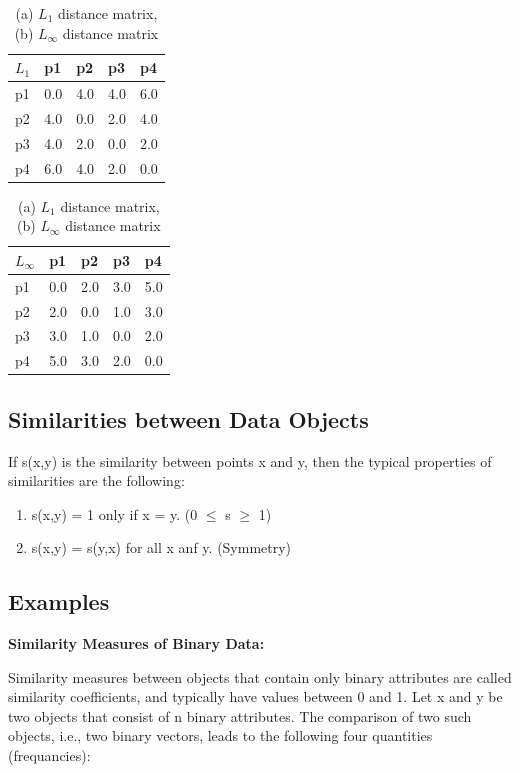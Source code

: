 	\begin{table}[H]
		\centering
		\begin{tabular}{| l | l | l | l | l |}
			\hline
			$L_{1}$ & p1 & p2 & p3 & p4 \\ \hline
			p1 & 0.0 & 4.0 & 4.0 & 6.0 \\ \hline
			p2 & 4.0 & 0.0 & 2.0 & 4.0 \\ \hline
			p3 & 4.0 & 2.0 & 0.0 & 2.0 \\ \hline
			p4 & 6.0 & 4.0 & 2.0 & 0.0 \\ \hline
		\end{tabular}
		\begin{tabular}{| l | l | l | l | l |}
			\hline
			$L_\infty$ & p1 & p2 & p3 & p4 \\ \hline 
			p1 & 0.0 & 2.0 & 3.0 & 5.0 \\ \hline
			p2 & 2.0 & 0.0 & 1.0 & 3.0 \\ \hline
			p3 & 3.0 & 1.0 & 0.0 & 2.0 \\ \hline
			p4 & 5.0 & 3.0 & 2.0 & 0.0 \\ \hline
		\end{tabular}
		\caption{(a) $L_{1}$ distance matrix, (b) $L_{\infty}$ distance matrix}
	\end{table}

\subsection*{Similarities between Data Objects}
	If s(x,y) is the similarity between points x and y, then the typical properties
	of similarities are the following:
		\begin{enumerate}
			\item s(x,y) = 1 only if x = y. (0 $\leq$ s $\geq$ 1)
			\item s(x,y) = s(y,x) for all x anf y. (Symmetry)
		\end{enumerate}

\subsection*{Examples}

	{\bf Similarity Measures of Binary Data:}

	Similarity measures between objects that contain only binary attributes are called
	similarity coefficients, and typically have values between 0 and 1.
	Let x and y be two objects that consist of n binary attributes. The comparison 
	of two such objects, i.e., two binary vectors, leads to the following four quantities
	(frequancies):

